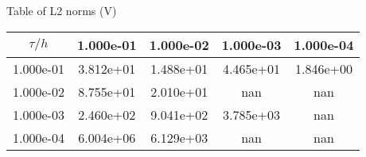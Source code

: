 \begin{center}
Table of L2 norms (V)
\\[2.0ex]  
  
\begin{tabular}{|c|c|c|c|c|} \hline
$\tau / h$ &1.000e-01 &1.000e-02 &1.000e-03 &1.000e-04 \\ \hline 
1.000e-01 &3.812e+01 &1.488e+01 &4.465e+01 &1.846e+00 \\ \hline 
1.000e-02 &8.755e+01 &2.010e+01 &nan &nan \\ \hline 
1.000e-03 &2.460e+02 &9.041e+02 &3.785e+03 &nan \\ \hline 
1.000e-04 &6.004e+06 &6.129e+03 &nan &nan \\ \hline 

\end{tabular}\\[20pt]
\end{center}
